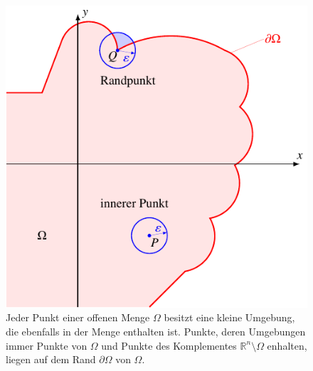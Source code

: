 %
%
%
\begin{figure}
\centering
\includegraphics{chapters/040-felder/images/offen.pdf}
\caption{Jeder Punkt einer offenen Menge $\Omega$ besitzt eine kleine
Umgebung, die ebenfalls in der Menge enthalten ist.
Punkte, deren Umgebungen immer Punkte von $\Omega$ und Punkte des
Komplementes $\mathbb{R}^n\setminus\Omega$ enhalten, liegen auf dem
Rand $\partial\Omega$ von $\Omega$.
\label{buch:felder:fundamentallemma:fig:offen}}
\end{figure}

